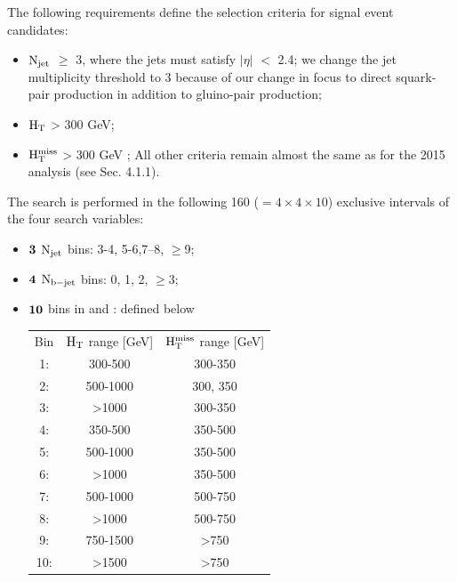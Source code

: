 The following requirements define the selection criteria for signal event candidates:
\begin{itemize}
\item $\rm N_{jet}$ $\geq$ 3, where the jets must satisfy $|\eta|$ $<$ 2.4; we change the jet multiplicity threshold to 3 because of our change in focus to direct squark-pair production in addition to gluino-pair production;
\item $\rm H_{T}$  > 300 GeV;
\item $\rm H_{T}^{miss}$ >  300 GeV ;
All other criteria remain almost the same as for the 2015 analysis (see Sec. 4.1.1).

\end{itemize}
The search is performed in the following 160 ($=4\times4\times10$) exclusive intervals of the four search variables:
\begin{itemize}

 \item ${\bf 3 }$ $\rm N_{jet}$ bins: 3-4, 5-6,7–8, $\geq$9;
 \item ${\bf 4 }$ $\rm N_{b-jet}$ bins: 0, 1, 2, $\geq$3;
 \item  ${\bf 10 }$ bins in \HT and \MHT: defined below



\begin{center}
\begin{tabular}{ c c c }
 Bin & $\rm H_{T}$ range [GeV] & $\rm H_{T}^{miss}$ range [GeV] \\ 
  1: & 300-500 & 300-350 \\ 

  2: & 500-1000 & 300, 350 \\  

  3: & >1000 & 300-350\\

  4:&  350-500 & 350-500\\

  5: & 500-1000 & 350-500\\

  6: & >1000 & 350-500\\

  7: & 500-1000 & 500-750\\

  8: & >1000 & 500-750\\

  9: & 750-1500 & >750\\

 10: & >1500 & >750\\


\end{tabular}
\end{center}


 
\end{itemize}


